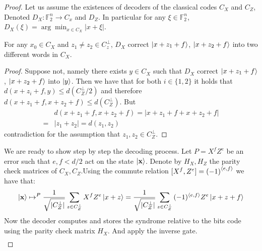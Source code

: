 \begin{proof}
  Let us assume the existences of decoders of the classical codes $C_{X}$ and $C_{Z}$, Denoted  $D_{X} : \mathbb{F}_{2}^{n} \rightarrow C_{x}$ and $D_{Z}$. In particular for any $\xi \in \mathbb{F}_{2}^{n}$, $D_{X}\left( \xi \right) = \arg \min_{x\in C_{X}} |x + \xi|$.             
    \begin{claim}
      For any $x_{0} \in C_{X}$ and $z_{1}\neq z_{2} \in C_{z}^{\perp}$, $D_{X}$ correct $\ket{x+z_{1}+f}$, $\ket{x+z_{2}+f}$ into two different words in $C_{X}$. 
    \begin{proof}
      Suppose not, namely there exists $y \in C_{X}$ such that $D_{X}$ correct $\ket{x+z_{1}+f}$, $\ket{x+z_{2}+f}$ into $\ket{y}$. Then we have that for both $i\in \{1,2\}$ it holds that  $d\left( x+z_{i} +f, y \right) \le d\left( C_{Z}^{\perp}/2 \right)$ and therefore $ d\left( x + z_{1} + f, x+z_{2} +f  \right) \le d\left( C_{Z}^{\perp} \right)$. But
      \begin{equation*}
        \begin{split}
            & d\left( x + z_{1} + f, x+z_{2} +f  \right) =  | x + z_{1} + f + x + z_{2} + f | \\
            =  & | z_{1} + z_{2} | = d\left( z_{1},z_{2} \right) 
        \end{split}
      \end{equation*}     
      contradiction for the assumption that $z_{1},z_{2} \in C_{Z}^{\perp}$.   
    \end{proof}
    \end{claim} 
    We are ready to show step by step the decoding process. Let $P = X^{f}Z^{e}$ be an error such that $e, f < d/2$ act on the state $\ket{\mathbf{x}}$. Denote by $H_{X}, H_{Z}$ the parity check matrices of $C_{X},C_{Z}$.Using the commute relation $[X^{f},Z^{e}] = \left( -1 \right)^{\braket{e,f}}$ we have that:  
      \begin{equation*}
      \begin{split}
        \ket{\mathbf{x}}   \mapsto^{P}   \frac{1}{\sqrt{|C_{Z}^{\perp}|}} \sum_{z \in C_{Z}^{\perp}}{ X^{f}Z^{e}\ket{ x + z }} = \frac{1}{\sqrt{|C_{Z}^{\perp}|}} \sum_{z \in C_{Z}^{\perp}}{ (-1)^{\braket{e,f} }Z^{e}\ket{ x + z + f}}
\end{split}
\end{equation*}
Now the decoder computes and stores the syndrome relative to the bits code using the parity check matrix $H_{X}$. And apply the inverse gate.     
      \begin{equation*}
      \begin{split}

\end{split}
\end{equation*}
\end{proof}
